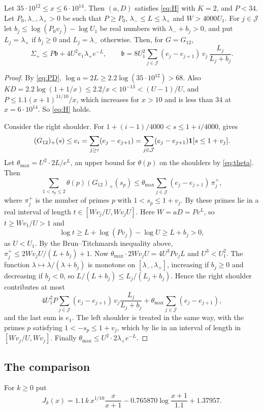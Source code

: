 \documentclass[11pt,colorlinks]{charlie}
\newcommand{\cJ}{\mathcal J}
\begin{document}
\begin{lemma}\label{lem:twelve-shoulders}
Let $35\cdot10^{12}\le x\le6\cdot10^{14}$. Then $(a,D)$ satisfies \eqref{eq:H} with $K=2$, and $P<34$. Let $P_0,\lambda_-,\lambda_+>0$ be such that $P\ge P_0$, $\lambda_-\le L\le\lambda_+$ and $W>4000U_1$. For $j\in\cJ$ let $b_j\le\log(P_0v_j)-\log U_1$ be real numbers with $\lambda_-+b_j>0$, and put $L_j=\lambda_+$ if $b_j\ge0$ and $L_j=\lambda_-$ otherwise. Then, for $G=G_{12}$,
\[
 \Sigma_+\le P\mathfrak b+4U^2e_1\lambda_+e^{-L},\qquad\mathfrak b=8U_1^2\sum_{j\in\cJ}(e_j-e_{j+1})\,v_j\,\frac{L_j}{L_j+b_j}.
\]
\end{lemma}
\begin{proof}
By \eqref{eq:PD}, $\log a=2L\ge2.2\log(35\cdot10^{12})>68$. Also $KD=2.2\log(1+1/x)\le2.2/x<10^{-13}<(U-1)/U$, and $P\le1.1(x+1)^{11/10}/x$, which increases for $x>10$ and is less than $34$ at $x=6\cdot10^{14}$. So \eqref{eq:H} holds.

Consider the right shoulder. For $1+(i-1)/4000<s\le1+i/4000$,  gives
\[
 (G_{12})_+(s)\le e_i=\sum_{j\ge i}(e_j-e_{j+1})=\sum_{j\in\cJ}(e_j-e_{j+1})\one[s\le1+v_j].
\]
Let $\theta_{\max}=U^2\cdot2L/e^L$, an upper bound for $\theta(p)$ on the shoulders by \eqref{eq:theta}. Then
\[
 \sum_{1<s_p\le2}\theta(p)(G_{12})_+(s_p)\le\theta_{\max}\sum_{j\in\cJ}(e_j-e_{j+1})\,\pi_j^+,
\]
where $\pi_j^+$ is the number of primes $p$ with $1<s_p\le1+v_j$. By  these primes lie in a real interval of length $t\in[Wv_j/U,Wv_jU]$. Here $W=aD=Pe^L$, so $t\ge Wv_1/U>1$ and
\[
 \log t\ge L+\log(Pv_j)-\log U\ge L+b_j>0,
\]
as $U<U_1$. By the Brun--Titchmarsh inequality above, $\pi_j^+\le2Wv_jU/(L+b_j)+1$. Now $\theta_{\max}\cdot2Wv_jU=4U^3Pv_jL$ and $U^3<U_1^2$. The function $\lambda\mapsto\lambda/(\lambda+b_j)$ is monotone on $[\lambda_-,\lambda_+]$, increasing if $b_j\ge0$ and decreasing if $b_j<0$, so $L/(L+b_j)\le L_j/(L_j+b_j)$. Hence the right shoulder contributes at most
\[
 4U_1^2P\sum_{j\in\cJ}(e_j-e_{j+1})\,v_j\frac{L_j}{L_j+b_j}+\theta_{\max}\sum_{j\in\cJ}(e_j-e_{j+1}),
\]
and the last sum is $e_1$. The left shoulder is treated in the same way, with the primes $p$ satisfying $1<-s_p\le1+v_j$, which by  lie in an interval of length in $[Wv_j/U,Wv_j]$. Finally $\theta_{\max}\le U^2\cdot2\lambda_+e^{-L}$.
\end{proof}

\subsection{The comparison}
For $k\ge0$ put
\[
 J_k(x)=1.1\,k\,x^{1/10}\frac x{x+1}-0.765870\log\frac{x+1}{1.1}+1.37957 .
\]
\end{document}

